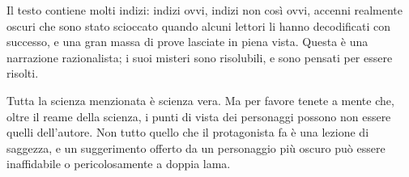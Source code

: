 Il testo contiene molti indizi: indizi ovvi, indizi non così ovvi, accenni realmente oscuri che sono stato scioccato quando alcuni lettori li hanno decodificati con successo, e una gran massa di prove lasciate in piena vista. Questa è una narrazione razionalista; i suoi misteri sono risolubili, e sono pensati per essere risolti.

Tutta la scienza menzionata è scienza vera. Ma per favore tenete a mente che, oltre il reame della scienza, i punti di vista dei personaggi possono non essere quelli dell’autore. Non tutto quello che il protagonista fa è una lezione di saggezza, e un suggerimento offerto da un personaggio più oscuro può essere inaffidabile o pericolosamente a doppia lama.
